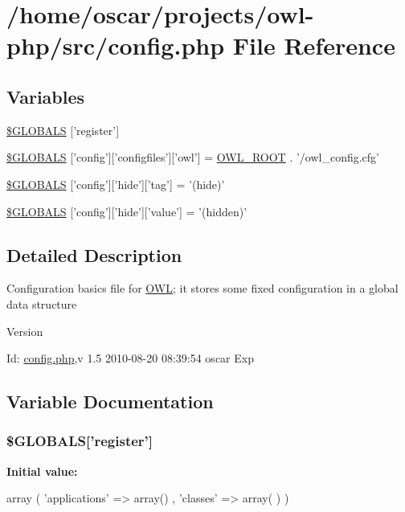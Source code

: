 \section{/home/oscar/projects/owl-\/php/src/config.php File Reference}
\label{config_8php}
\subsection*{Variables}
\begin{DoxyCompactItemize}
\item 
\hyperlink{config_8php_a6cc1ef3a8c20d69988531d27f931855b}{\$GLOBALS} \mbox{[}'register'\mbox{]}
\item 
\hyperlink{config_8php_a36e909583250c43d72bdc7c09e2d4a20}{\$GLOBALS} \mbox{[}'config'\mbox{]}\mbox{[}'configfiles'\mbox{]}\mbox{[}'owl'\mbox{]} = \hyperlink{index_8php_a35612f9a6bd7277982731a74593272c4}{OWL\_\-ROOT} . '/owl\_\-config.cfg'
\item 
\hyperlink{config_8php_a15cc7b8e0baf358db666b97bd9c7fcf5}{\$GLOBALS} \mbox{[}'config'\mbox{]}\mbox{[}'hide'\mbox{]}\mbox{[}'tag'\mbox{]} = '(hide)'
\item 
\hyperlink{config_8php_a7b69aee0b150d2e6556beaff4a99e589}{\$GLOBALS} \mbox{[}'config'\mbox{]}\mbox{[}'hide'\mbox{]}\mbox{[}'value'\mbox{]} = '(hidden)'
\end{DoxyCompactItemize}


\subsection{Detailed Description}
Configuration basics file for \hyperlink{classOWL}{OWL}; it stores some fixed configuration in a global data structure \begin{DoxyVersion}{Version}

\end{DoxyVersion}
\begin{DoxyParagraph}{Id:}
\hyperlink{config_8php}{config.php},v 1.5 2010-\/08-\/20 08:39:54 oscar Exp 
\end{DoxyParagraph}


\subsection{Variable Documentation}
\subsubsection[{\$GLOBALS}]{\setlength{\rightskip}{0pt plus 5cm}\$GLOBALS\mbox{[}'register'\mbox{]}}\label{config_8php_a6cc1ef3a8c20d69988531d27f931855b}
{\bfseries Initial value:}
\begin{DoxyCode}
 array (
                                          'applications'        => array()
                                        , 'classes'                     => array(
      )
                                )
\end{DoxyCode}


